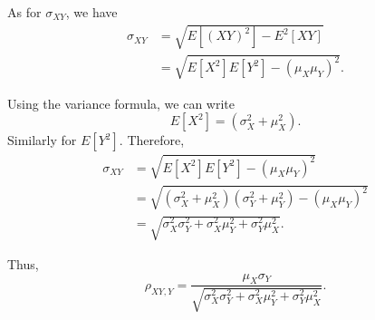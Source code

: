 \documentclass{article}
\begin{document}
\noindent As for $\sigma_{XY}$, we have
\begin{align}
\sigma_{XY} &=\sqrt{E[(XY)^2]-E^2[XY]} \\ 
&= \sqrt{E[X^2]E[Y^2]-(\mu_X\mu_Y)^2}.
\end{align}

\noindent Using the variance formula, we can write $$E[X^2] = (\sigma^2_X + \mu_X^2).$$  Similarly for $E[Y^2]$.  Therefore,
\begin{align}
\sigma_{XY} &= \sqrt{E[X^2]E[Y^2]-(\mu_X\mu_Y)^2} \\
&= \sqrt{(\sigma^2_X + \mu_X^2)(\sigma^2_Y + \mu_Y^2)-(\mu_X\mu_Y)^2} \\
&= \sqrt{\sigma^2_X\sigma^2_Y+\sigma^2_X\mu^2_Y+\sigma^2_Y\mu^2_X}.
\end{align}

\noindent Thus, $$\rho_{XY,Y} = \frac{\mu_X\sigma_Y}{\sqrt{\sigma^2_X\sigma^2_Y+\sigma^2_X\mu^2_Y+\sigma^2_Y\mu^2_X}}.$$
\end{document}
